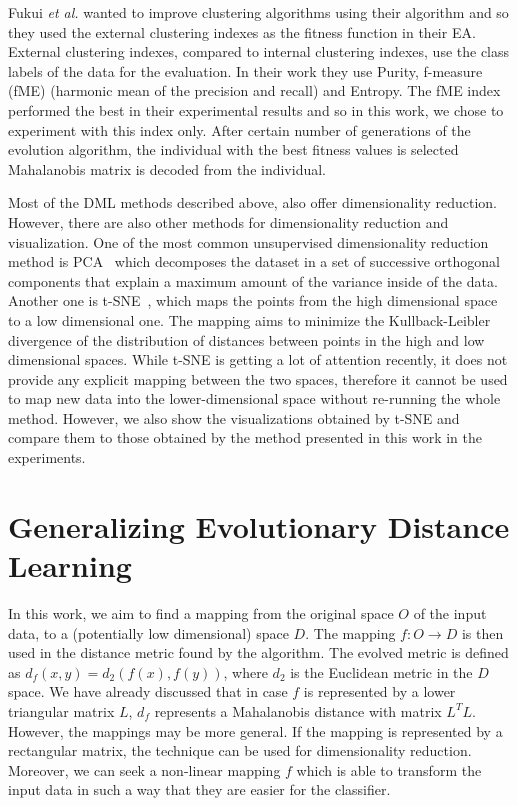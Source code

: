 Fukui \emph{et al.} wanted to improve clustering algorithms using their algorithm and so they used the external clustering indexes as the fitness function in their EA. External clustering indexes, compared to internal clustering indexes, use the class labels of the data for the evaluation. In their work they use Purity, f-measure (fME) (harmonic mean of the precision and recall) and Entropy. The fME index performed the best in their experimental results and so in this work, we chose to experiment with this index only. After certain number of generations of the evolution algorithm, the individual with the best fitness values is selected Mahalanobis matrix is decoded from the individual.

Most of the DML methods described above, also offer dimensionality reduction. However, there are also other methods for dimensionality reduction and visualization. One of the most common unsupervised dimensionality reduction method is PCA~\cite{jolliffe2002principal} which decomposes the dataset in a set of successive orthogonal components that explain a maximum amount of the variance inside of the data. Another one is t-SNE~\cite{maaten2008visualizing}, which maps the points from the high dimensional space to a low dimensional one. The mapping aims to minimize the Kullback-Leibler divergence of the distribution of distances between points in the high and low dimensional spaces. While t-SNE is getting a lot of attention recently, it does not provide any explicit mapping between the two spaces, therefore it cannot be used to map new data into the lower-dimensional space without re-running the whole method. However, we also show the visualizations obtained by t-SNE and compare them to those obtained by the method presented in this work in the experiments.

\section{Generalizing Evolutionary Distance Learning}

In this work, we aim to find a mapping from the original space $O$ of the input data, to a (potentially low dimensional) space $D$. The mapping $f: O \to D$ is then used in the distance metric found by the algorithm. The evolved metric is defined as $d_f(x, y) = d_2(f(x), f(y))$, where $d_2$ is the Euclidean metric in the $D$ space. We have already discussed that in case $f$ is represented by a lower triangular matrix $L$, $d_f$ represents a Mahalanobis distance with matrix $L^TL$. However, the mappings may be more general. If the mapping is represented by a rectangular matrix, the technique can be used for dimensionality reduction. Moreover, we can seek a non-linear mapping $f$ which is able to transform the input data in such a way that they are easier for the classifier.

